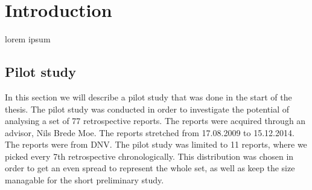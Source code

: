 \chapter{Introduction}
lorem ipsum

\section{Pilot study}

In this section we will describe a pilot study that was done in the start of the thesis. The pilot study was conducted in order to investigate the potential of analysing a set of 77 retrospective reports. The reports were acquired through an advisor, Nils Brede Moe. The reports stretched from 17.08.2009 to 15.12.2014. The reports were from DNV. The pilot study was limited to 11 reports, where we picked every 7th retrospective chronologically. This distribution was chosen in order to get an even spread to represent the whole set, as well as keep the size managable for the  short preliminary study.